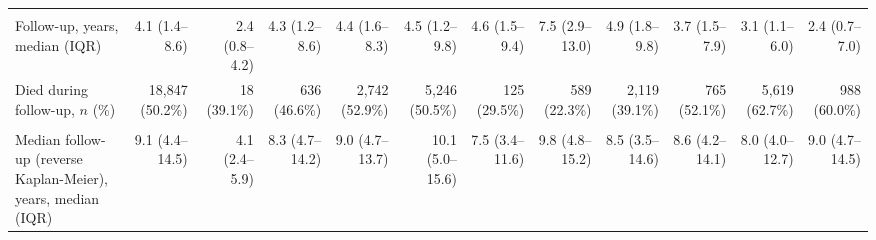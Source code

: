 \begin{table}
{\begin{tabular}{@{}lrrrrrrrrrrr@{}}
\addlinespace
\multicolumn{12}{@{}l}{\sffamily\bfseries Follow-up}\\
Follow-up, years, median (IQR) & 4.1 (1.4–8.6) & 2.4 (0.8–4.2) & 4.3 (1.2–8.6) & 4.4 (1.6–8.3) & 4.5 (1.2–9.8) & 4.6 (1.5–9.4) & 7.5 (2.9–13.0) & 4.9 (1.8–9.8) & 3.7 (1.5–7.9) & 3.1 (1.1–6.0) & 2.4 (0.7–7.0) \\
Died during follow-up, $n$ (\%) & 18,847 (50.2\%) & 18 (39.1\%) & 636 (46.6\%) & 2,742 (52.9\%) & 5,246 (50.5\%) & 125 (29.5\%) & 589 (22.3\%) & 2,119 (39.1\%) & 765 (52.1\%) & 5,619 (62.7\%) & 988 (60.0\%) \\
\addlinespace
\multicolumn{12}{@{}l}{\sffamily\bfseries Other characteristics}\\
Median follow-up (reverse Kaplan-Meier), years, median (IQR) & 9.1 (4.4–14.5) & 4.1 (2.4–5.9) & 8.3 (4.7–14.2) & 9.0 (4.7–13.7) & 10.1 (5.0–15.6) & 7.5 (3.4–11.6) & 9.8 (4.8–15.2) & 8.5 (3.5–14.6) & 8.6 (4.2–14.1) & 8.0 (4.0–12.7) & 9.0 (4.7–14.5) \\
\bottomrule
\end{tabular}}
\par\vspace{1mm}{\scriptsize Counts of 1--4 are shown as $<$5. Percentages use patients with a recorded value; history summaries use records before the index date.}
\end{table}
